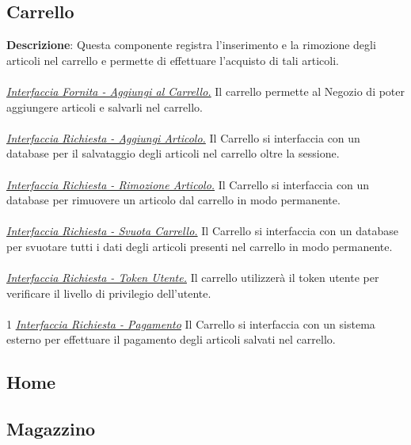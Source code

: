 \documentclass{report}
\begin{document}
\subsection*{Carrello}

\textbf{Descrizione}: Questa componente registra l'inserimento e la rimozione degli articoli nel carrello e permette di effettuare l'acquisto di tali articoli. \\ \\
\uline{\textit{Interfaccia Fornita - Aggiungi al Carrello.}} Il carrello permette al Negozio di poter aggiungere articoli e salvarli nel carrello.\\ \\
\uline{\textit{Interfaccia Richiesta - Aggiungi Articolo.}} Il Carrello si interfaccia con un database per il salvataggio degli articoli nel carrello oltre la sessione.\\ \\
\uline{\textit{Interfaccia Richiesta - Rimozione Articolo.}} 
Il Carrello si interfaccia con un database per rimuovere un articolo dal carrello in modo permanente.\\ \\
\uline{\textit{Interfaccia Richiesta - Svuota Carrello.}}
Il Carrello si interfaccia con un database per svuotare tutti i dati degli articoli presenti nel carrello in modo permanente.\\ \\
\uline{\textit{Interfaccia Richiesta - Token Utente.}} Il carrello utilizzerà il token utente per verificare il livello di privilegio dell'utente.\\ \\1
\uline{\textit{Interfaccia Richiesta - Pagamento}}
Il Carrello si interfaccia con un sistema esterno per effettuare il pagamento degli articoli salvati nel carrello.

\subsection*{Home}

\subsection*{Magazzino}
\end{document}
